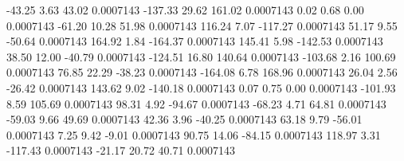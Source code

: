       -43.25        3.63       43.02     0.0007143
     -137.33       29.62      161.02     0.0007143
        0.02        0.68        0.00     0.0007143
      -61.20       10.28       51.98     0.0007143
      116.24        7.07     -117.27     0.0007143
       51.17        9.55      -50.64     0.0007143
      164.92        1.84     -164.37     0.0007143
      145.41        5.98     -142.53     0.0007143
       38.50       12.00      -40.79     0.0007143
     -124.51       16.80      140.64     0.0007143
     -103.68        2.16      100.69     0.0007143
       76.85       22.29      -38.23     0.0007143
     -164.08        6.78      168.96     0.0007143
       26.04        2.56      -26.42     0.0007143
      143.62        9.02     -140.18     0.0007143
        0.07        0.75        0.00     0.0007143
     -101.93        8.59      105.69     0.0007143
       98.31        4.92      -94.67     0.0007143
      -68.23        4.71       64.81     0.0007143
      -59.03        9.66       49.69     0.0007143
       42.36        3.96      -40.25     0.0007143
       63.18        9.79      -56.01     0.0007143
        7.25        9.42       -9.01     0.0007143
       90.75       14.06      -84.15     0.0007143
      118.97        3.31     -117.43     0.0007143
      -21.17       20.72       40.71     0.0007143
